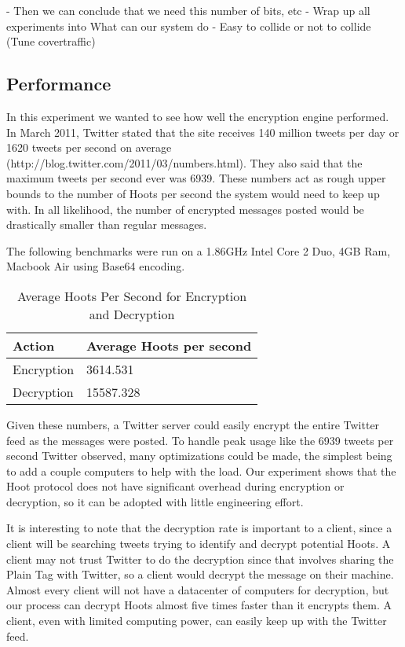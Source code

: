 \documentclass{acm_proc_article-sp}
\begin{document}
- Then we can conclude that we need this number of bits, etc
- Wrap up all experiments into What can our system do
	- Easy to collide or not to collide (Tune covertraffic)

\subsection{Performance}

In this experiment we wanted to see how well the encryption engine performed. In March 2011, Twitter stated that the site receives 140 million tweets per day or 1620 tweets per second on average (http://blog.twitter.com/2011/03/numbers.html). They also said that the maximum tweets per second ever was 6939. These numbers act as rough upper bounds to the number of Hoots per second the system would need to keep up with. In all likelihood, the number of encrypted messages posted would be drastically smaller than regular messages.

The following benchmarks were run on a 1.86GHz Intel Core 2 Duo, 4GB Ram, Macbook Air using Base64 encoding. 


\begin{table}
\caption{Average Hoots Per Second for Encryption and Decryption}
\begin{center}
    \begin{tabular}{ l  l }
	\hline
	Action & Average Hoots per second \\ \hline
	Encryption & 3614.531 \\
	Decryption & 15587.328 \\ \hline
    \end{tabular}
\end{center}
\end{table}

Given these numbers, a Twitter server could easily encrypt the entire Twitter feed as the messages were posted. To handle peak usage like the 6939 tweets per second Twitter observed, many optimizations could be made, the simplest being to add a couple computers to help with the load. Our experiment shows that the Hoot protocol does not have significant overhead during encryption or decryption, so it can be adopted with little engineering effort.

It is interesting to note that the decryption rate is important to a client, since a client will be searching tweets trying to identify and decrypt potential Hoots. A client may not trust Twitter to do the decryption since that involves sharing the Plain Tag with Twitter, so a client would decrypt the message on their machine. Almost every client will not have a datacenter of computers for decryption, but our  process can decrypt Hoots almost five times faster than it encrypts them. A client, even with limited computing power, can easily keep up with the Twitter feed.
\end{document}
